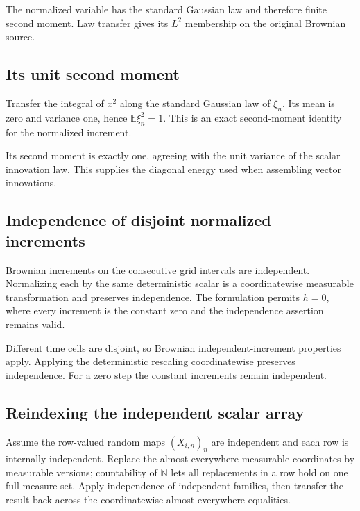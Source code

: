 \documentclass[11pt,a4paper]{report}
\begin{document}
The normalized variable has the standard Gaussian law and therefore finite second moment. Law transfer gives its \(L^2\) membership on the original Brownian source.

\subsection{\texorpdfstring{Its unit second moment}{Its unit second moment}}
\label{report-step-UnadjustedLangevin-BrownianInnovations-lean-4}


Transfer the integral of \(x^2\) along the standard Gaussian law of \(\xi_n\). Its mean is zero and variance one, hence \(\mathbb E\xi_n^2=1\). This is an exact second-moment identity for the normalized increment.



Its second moment is exactly one, agreeing with the unit variance of the scalar innovation law. This supplies the diagonal energy used when assembling vector innovations.

\subsection{\texorpdfstring{Independence of disjoint normalized increments}{Independence of disjoint normalized increments}}
\label{report-step-UnadjustedLangevin-BrownianInnovations-lean-5}


Brownian increments on the consecutive grid intervals are independent. Normalizing each by the same deterministic scalar is a coordinatewise measurable transformation and preserves independence. The formulation permits \(h=0\), where every increment is the constant zero and the independence assertion remains valid.



Different time cells are disjoint, so Brownian independent-increment properties apply. Applying the deterministic rescaling coordinatewise preserves independence. For a zero step the constant increments remain independent.

\subsection{\texorpdfstring{Reindexing the independent scalar array}{Reindexing the independent scalar array}}
\label{report-step-UnadjustedLangevin-BrownianInnovations-lean-6}


Assume the row-valued random maps \((X_{i,n})_n\) are independent and each row is internally independent. Replace the almost-everywhere measurable coordinates by measurable versions; countability of \(\mathbb N\) lets all replacements in a row hold on one full-measure set. Apply independence of independent families, then transfer the result back across the coordinatewise almost-everywhere equalities.
\end{document}
